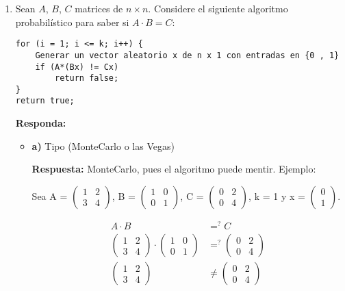\documentclass{templateNote}
\begin{document}
\begin{enumerate}
    \item Sean $A$, $B$, $C$ matrices de $n \times n$. Considere el siguiente algoritmo probabilístico para saber si $A \cdot B = C$:
\begin{verbatim}
for (i = 1; i <= k; i++) {
    Generar un vector aleatorio x de n x 1 con entradas en {0 , 1}
    if (A*(Bx) != Cx)
        return false;
}
return true;
\end{verbatim}

    \textbf{Responda:}
    \begin{itemize}
        \item \textbf{a)} Tipo (MonteCarlo o las Vegas)
        
        \textbf{Respuesta:} MonteCarlo, pues el algoritmo puede mentir.
        Ejemplo:
        
        Sea A = $\begin{pmatrix} 1 & 2 \\ 3 & 4 \end{pmatrix}$, B = $\begin{pmatrix} 1 & 0 \\ 0 & 1 \end{pmatrix}$, C = $\begin{pmatrix} 0 & 2 \\ 0 & 4 \end{pmatrix}$, k = 1 y x = $\begin{pmatrix} 0 \\ 1 \end{pmatrix}$. 
        
        \begin{align*}
            A \cdot B &=^? C \\
            \begin{pmatrix} 1 & 2 \\ 3 & 4 \end{pmatrix} \cdot \begin{pmatrix} 1 & 0 \\ 0 & 1 \end{pmatrix} &=^? \begin{pmatrix} 0 & 2 \\ 0 & 4 \end{pmatrix} \\
            \begin{pmatrix} 1 & 2 \\ 3 & 4 \end{pmatrix} &\neq \begin{pmatrix} 0 & 2 \\ 0 & 4 \end{pmatrix}
        \end{align*}


\end{itemize}
\end{enumerate}
\end{document}
